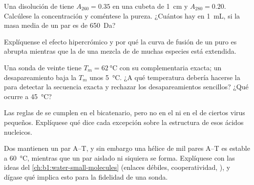 \begin{exercise}[$\star\star$]\label{exo:b1:nucleic-acids:7}
Una disolución de  tiene $A_{260} = 0.35$ en una cubeta de \qty{1}{cm} y
$A_{280} = 0.20$. Calcúlese la concentración y coméntese la pureza.
¿Cuántos  hay en \qty{1}{mL}, si la masa media de un par es de
\qty{650}{Da}?
\end{exercise}

\begin{exercise}[$\star\star$]\label{exo:b1:nucleic-acids:8}
Explíquense el efecto hipercrómico y por qué la curva de fusión de un 
puro es abrupta mientras que la de una mezcla de  de muchas especies está
extendida.
\end{exercise}

\begin{exercise}[$\star\star$]\label{exo:b1:nucleic-acids:9}
Una sonda de veinte  tiene $T_m = \qty{62}{\celsius}$ con su
complementaria exacta; un desapareamiento baja la $T_m$ unos
\qty{5}{\celsius}. ¿A qué temperatura debería hacerse la  para
detectar la secuencia exacta y rechazar los desapareamientos sencillos? ¿Qué
ocurre a \qty{45}{\celsius}?
\end{exercise}

\begin{exercise}[$\star\star\star$]\label{exo:b1:nucleic-acids:10}
Las reglas de  se cumplen en el  bicatenario, pero no en el 
ni en el  de ciertos virus pequeños. Explíquese qué dice cada excepción
sobre la estructura de esos ácidos nucleicos.
\end{exercise}

\begin{exercise}[$\star\star\star$]\label{exo:b1:nucleic-acids:11}
Dos  mantienen un par A--T, y sin embargo una hélice de
mil pares A--T es estable a \qty{60}{\celsius}, mientras que un par aislado
ni siquiera se forma. Explíquese con las ideas del
\cref{ch:b1:water-small-molecules} (enlaces débiles, cooperatividad,
), y dígase qué implica esto para la fidelidad de una sonda.
\end{exercise}

